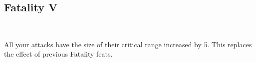 \subsection*{Fatality V}\label{feat:fatality5}
 \\

All your attacks have the size of their critical range increased by 5. This
replaces the effect of previous Fatality feats.
